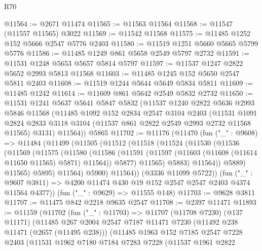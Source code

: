 \begin{lexlean}{R70}
\begin{coremodule}
@11564 := @2671 @11474
@11565 := @11563 @11564
@11568 := @11547 (@11557 @11565) @3022
@11569 := @11542 @11568
@11575 := @11485 @1252 @152 @5666 @2547 @5776 @2403
@11580 := @11519 @1251 @5660 @5665 @5799 @5776
@11586 := @11485 @1249 @861 @5658 @2549 @5797 @2732
@11591 := @11531 @1248 @5653 @5657 @5814 @5797
@11597 := @11537 @1247 @2822 @5652 @2993 @5813 @11568
@11603 := @11485 @1245 @152 @5650 @2547 @5811 @2403
@11608 := @11519 @1244 @5644 @5649 @5834 @5811
@11609 := @11485 @1242
@11614 := @11609 @861 @5642 @2549 @5832 @2732
@11650 := @11531
    @1241
    @5637
    @5641
    @5847
    @5832
    (@11537
      @1240
      @2822
      @5636
      @2993
      @5846
      @11568
      (@11485
        @1092
        @152
        @2834
        @2547
        @3104
        @2403
        (@11531
          @1091
          @2824
          @2833
          @3118
          @3104
          (@11537 @861 @2822 @2549 @2993 @2732 @11568 @11565)
          @3131)
        @11564))
    @5865
@11702 := @11176
    (@11470
      (fun ("_" : @9608) =>
      @11484
        (@11499
          (@11505
            (@11512
              (@11518
                (@11524
                  (@11530
                    (@11536
                      (@11569
                        (@11575
                          (@11580
                            (@11586
                              (@11591
                                (@11597 (@11603 (@11608 (@11614 @11650 @11565) @5871) @11564))
                                @5877)
                              @11565)
                            @5883)
                          @11564))
                      @5889)
                    @11565)
                  @5895)
                @11564)
              @5900)
            @11564))
        (@3336 @11099 @5722))
      (fun ("_" : @9607 @3811) => @4200 @11474 @430 @19 @152 @2547 @2547 @2403 @4374 @11564 @4377))
    (fun ("_" : @9629) => @11555 @148)
@11703 := @9628 @3811
@11707 := @11475 @842 @2218 @9635 @2547
@11708 := @2397 @11471
@11893 := @11159
    (@11702
      (fun ("_" : @11703) =>
      @11707
        (@11708 @7230)
        (@137 @11171)
        (@11485
          @267
          @2004
          @2547
          @7187
          @11471
          @7230
          (@11492 @238 @11471 (@2657 (@11495 @238)))
          (@11485
            @1963
            @152
            @7185
            @2547
            @7228
            @2403
            (@11531
              @1962
              @7180
              @7184
              @7283
              @7228
              (@11537
                @1961
                @2822

\end{coremodule}
\end{lexlean}

